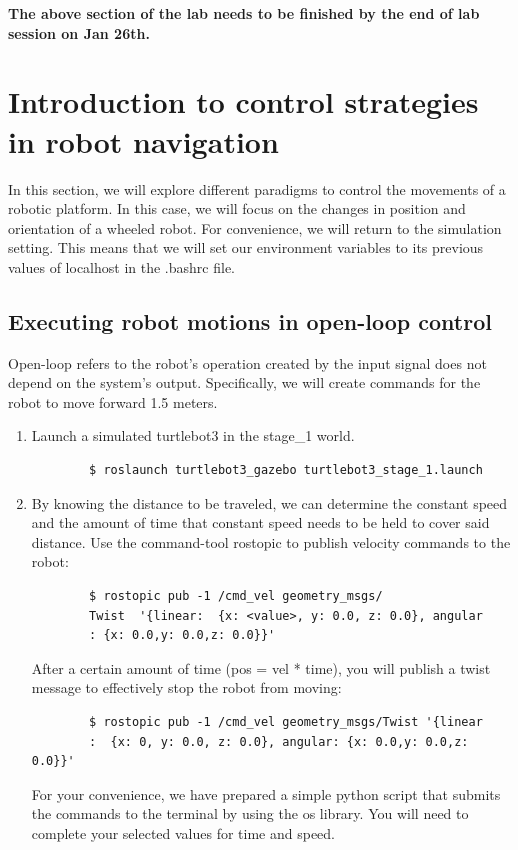 \documentclass[12pt]{article}
\begin{document}
\textbf{The above section of the lab needs to be finished by the end of lab session on Jan 26th.} 


\section{Introduction to control strategies in robot navigation
}
In this section, we will explore different paradigms to control the movements of a robotic platform. In this case, we will focus on the changes in position and orientation of a wheeled robot. For convenience, we will return to the simulation setting.
This means that we will set our environment variables to its previous values of localhost in the .bashrc file. 

\subsection{Executing robot motions in open-loop control}

Open-loop refers to the robot’s operation created by the input signal does not depend on the system’s output. Specifically, we will create commands for the robot to move forward 1.5 meters.
\begin{enumerate}
    \item Launch a simulated turtlebot3 in the stage\_1 world.
    \begin{verbatim}
        $ roslaunch turtlebot3_gazebo turtlebot3_stage_1.launch
    \end{verbatim}
    \item By knowing the distance to be traveled, we can determine the constant speed and the amount of time that constant speed needs to be held to cover said distance. Use the command-tool rostopic to publish velocity commands to the robot:
    \begin{verbatim}
        $ rostopic pub -1 /cmd_vel geometry_msgs/
        Twist  '{linear:  {x: <value>, y: 0.0, z: 0.0}, angular
        : {x: 0.0,y: 0.0,z: 0.0}}'
    \end{verbatim}
    After a certain amount of time (pos = vel * time), you will publish a twist message to effectively stop the robot from moving:

    \begin{verbatim}
        $ rostopic pub -1 /cmd_vel geometry_msgs/Twist '{linear
        :  {x: 0, y: 0.0, z: 0.0}, angular: {x: 0.0,y: 0.0,z: 0.0}}'
    \end{verbatim}
    
    For your convenience, we have prepared a simple python script that submits the commands to the terminal by using the os library. You will need to complete your selected values for time and speed.
    
    
    
\end{enumerate}
\end{document}
